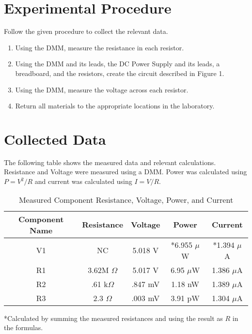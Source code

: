 \documentclass[journal]{IEEEtran}
\begin{document}
\section{Experimental Procedure}

Follow the given procedure to collect the relevant data.

\begin{enumerate}
\item
Using the DMM, measure the resistance in each resistor.
\item
Using the DMM and its leads, the DC Power Supply and its leads, a breadboard, and 
the resistors, create the circuit described in Figure 1.
\item
Using the DMM, measure the voltage across each resistor.
\item
Return all materials to the appropriate locations in the laboratory.
\end{enumerate}

\section{Collected Data}

The following table shows the measured data and relevant calculations.
Resistance and Voltage were measured using a DMM. Power was calculated using
$P=V^{2}/R$ and current was calculated using $I=V/R$.

\newpage

\begin{table}[h!]
\renewcommand{\arraystretch}{1.5}
\caption{Measured Component Resistance, Voltage, Power, and Current}
\label{table_measured_rvpi}
\centering
\begin{tabular}{|c|c|c|c|c|}
\hline
Component Name & Resistance & Voltage & Power & Current\\
\hline
V1 & NC & 5.018 V & *6.955 $\mu$W & *1.394 $\mu$A\\
\hline
R1 & 3.62M $\Omega$ & 5.017 V & 6.95 $\mu$W & 1.386 $\mu$A\\
\hline
R2 & .61 k$\Omega$ & .847 mV & 1.18 nW & 1.389 $\mu$A\\
\hline
R3 & 2.3 $\Omega$ & .003 mV & 3.91 pW & 1.304 $\mu$A\\
\hline
\end{tabular}
\end{table}

*Calculated by summing the measured resistances and using the result as $R$ in the formulas.
\end{document}
